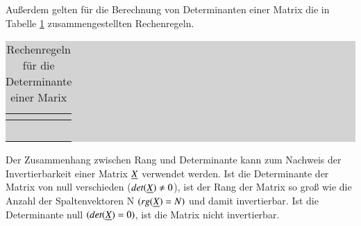 \noindent Au{\ss}erdem gelten f\"{u}r die Berechnung von Determinanten einer Matrix die in Tabelle \ref{tab:fifteeneight} zusammengestellten Rechenregeln.

\begin{table}[H]
\setlength{\arrayrulewidth}{.1em}
\caption{Rechenregeln f\"{u}r  die Determinante einer Marix}
\setlength{\fboxsep}{0pt}%
\colorbox{lightgray}{%
%
\begin{tabular}{| c | c |}
\hline
\parbox[c][0.3in][c]{3.2in}{\smallskip\centering\textbf{\selectfont{Bedingung}}} & 
\parbox[c][0.3in][c]{3.2in}{\smallskip\centering\textbf{\selectfont{Mathematische Beschreibung}}}\\ \hline

\parbox[c][0.4in][c]{3.2in}{} &
\parbox[c][0.4in][c]{3.2in}{}\\ \hline

\parbox[c][0.4in][c]{3.2in}{} & 
\parbox[c][0.4in][c]{3.2in}{}\\ \hline

\parbox[c][0.4in][c]{3.2in}{} & 
\parbox[c][0.4in][c]{3.2in}{}\\ \hline

\parbox[c][0.4in][c]{3.2in}{} & 
\parbox[c][0.4in][c]{3.2in}{}\\ \hline

\parbox[c][0.4in][c]{3.2in}{} & 
\parbox[c][0.4in][c]{3.2in}{}\\ \hline

\end{tabular}%
}
\label{tab:fifteeneight}
\end{table}

\noindent Der Zusammenhang zwischen Rang und Determinante kann zum Nachweis der Invertierbarkeit einer Matrix $\underline{X}$ verwendet werden. Ist die Determinante der Matrix von null verschieden ($det(\underline{X}) \neq 0$), ist der Rang der Matrix so gro{\ss} wie die Anzahl der Spaltenvektoren N $(rg(\underline{X}) = N )$ und damit invertierbar. Ist die Determinante null $(det(\underline{X}) = 0)$, ist die Matrix nicht invertierbar.\newline

